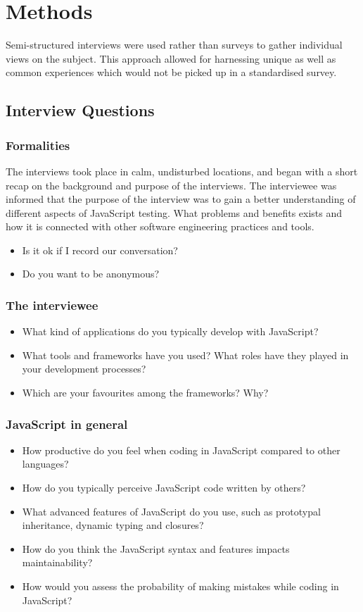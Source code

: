 \documentclass[11pt]{article}
\begin{document}
\section{Methods}

Semi-structured interviews were used rather than surveys to gather individual views on the subject. This approach allowed for harnessing unique as well as common experiences which would not be picked up in a standardised survey.

\subsection{Interview Questions}
\subsubsection{Formalities}
The interviews took place in calm, undisturbed locations, and began with a short recap on the background and purpose of the interviews. The interviewee was informed that the purpose of the interview was to gain a better understanding of different aspects of JavaScript testing. What problems and benefits exists and how it is connected with other software engineering practices and tools.

\begin{itemize}
\item Is it ok if I record our conversation?
\item Do you want to be anonymous?
\end{itemize}

\subsubsection{The interviewee}
\begin{itemize}
\item What kind of applications do you typically develop with JavaScript?
\item What tools and frameworks have you used? What roles have they played in your development processes?
\item Which are your favourites among the frameworks? Why?
\end{itemize}

\subsubsection{JavaScript in general}
\begin{itemize}
\item How productive do you feel when coding in JavaScript compared to other languages?
\item How do you typically perceive JavaScript code written by others?
\item What advanced features of JavaScript do you use, such as prototypal inheritance, dynamic typing and closures?
\item How do you think the JavaScript syntax and features impacts maintainability?
\item How would you assess the probability of making mistakes while coding in JavaScript?
\end{itemize}
\end{document}
